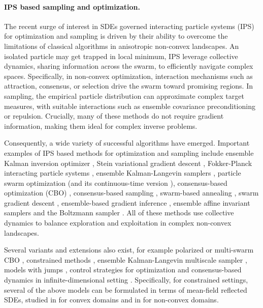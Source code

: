 \documentclass{article}
\numberwithin{equation}{section}
\begin{document}
\paragraph{IPS based sampling and optimization.}
The recent surge of interest in SDEs governed interacting particle systems (IPS) for optimization and sampling is driven by their ability to overcome the limitations of classical algorithms in anisotropic non-convex landscapes. An isolated particle may get trapped in local minimum, IPS leverage collective dynamics, sharing information across the swarm, to efficiently navigate complex spaces. Specifically, in non-convex optimization, interaction mechanisms such as attraction, consensus, or selection drive the swarm toward promising regions. In sampling, the empirical particle distribution can approximate complex target measures, with suitable interactions such as ensemble covariance preconditioning or repulsion. Crucially, many of these methods do not require gradient information, making them ideal for complex inverse problems. 

Consequently, a wide variety of successful algorithms have emerged. Important examples of IPS based methods for optimization and sampling include  ensemble Kalman inversion optimizer \cite{iglesias2013ensemble, chada2020tikhonov,chada2022convergence}, Stein variational gradient descent \cite{liu2019stein}, Fokker-Planck interacting particle systems \cite{reich2021fokker}, ensemble Kalman-Langevin samplers \cite{garbunoinigo2019interacting,garbuno2020affine,ringh2025kalman},   particle swarm optimization \cite{kennedy_particle_1995} (and its continuous-time version \cite{grassi2023mean}), consensus-based optimization (CBO) \cite{pinnau2017consensus,carrillo2018analytical,totzeck2021trends},   consensus-based sampling \cite{carrillo2022consensus_sampling}, swarm-based annealing \cite{ding2024swarm}, swarm gradient descent \cite{bolte2024swarm}, ensemble-based gradient inference \cite{schillings2023ensemble}, ensemble affine invariant samplers \cite{goodman2010ensemble} and the Boltzmann sampler \cite{chen2024bayesian_boltzmann}.  All of these methods use collective dynamics to balance exploration and exploitation in complex non-convex landscapes. 


Several variants and extensions also exist, for example polarized or multi-swarm CBO \cite{bungert2025polarized,klamroth2024consensus}, constrained  methods \cite{borghi2023constrained, bae2022constrained, cbo_eki_constrained, bungert2025mirrorcbo}, ensemble Kalman-Langevin multiscale sampler \cite{pavliotis2022derivative}, models with jumps \cite{kalise2023consensus,borghi2025swarm_bgk},  control strategies for optimization \cite{molin2025controlled,huang2026fast, aubert2026controlled} and consensus-based dynamics in infinite-dimensional setting \cite{huang2026derivative}. Specifically, for constrained settings, several of the above models can be formulated in terms of mean-field reflected SDEs, studied in \cite{adams2022large} for convex domains and in \cite{hinds2025well} for non-convex domains.   
 
\end{document}
